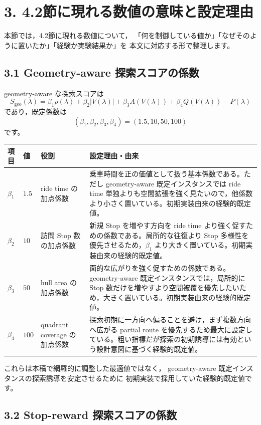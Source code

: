 \documentclass[a4paper,11pt]{article}
\begin{document}
\section*{3. 4.2節に現れる数値の意味と設定理由}

本節では，4.2節に現れる数値について，
「何を制御している値か」「なぜそのように置いたか」「経験か実験結果か」を
本文に対応する形で整理します。

\subsection*{3.1 Geometry-aware 探索スコアの係数}

geometry-aware な探索スコアは
\[
S_{\mathrm{geo}}(\lambda) =
\beta_1 \rho(\lambda)
+ \beta_2 |V(\lambda)|
+ \beta_3 A(V(\lambda))
+ \beta_4 Q(V(\lambda))
- P(\lambda)
\]
であり，既定係数は
\[
(\beta_1,\beta_2,\beta_3,\beta_4)=(1.5,10,50,100)
\]
です。

\begin{tabularx}{\linewidth}{L{2.0cm}L{2.0cm}L{3.5cm}X}
\toprule
項目 & 値 & 役割 & 設定理由・由来 \\
\midrule
$\beta_1$ & $1.5$ & ride time の加点係数 & 乗車時間を正の価値として扱う基本係数である。ただし geometry-aware 既定インスタンスでは ride time 単独よりも空間拡張を強く見たいので，他係数より小さく置いている。初期実装由来の経験的既定値。 \\
$\beta_2$ & $10$ & 訪問 Stop 数の加点係数 & 新規 Stop を増やす方向を ride time より強く促すための係数である。局所的な往復より Stop 多様性を優先させるため，$\beta_1$ より大きく置いている。初期実装由来の経験的既定値。 \\
$\beta_3$ & $50$ & hull area の加点係数 & 面的な広がりを強く促すための係数である。geometry-aware 既定インスタンスでは，局所的に Stop 数だけを増やすより空間被覆を優先したいため，大きく置いている。初期実装由来の経験的既定値。 \\
$\beta_4$ & $100$ & quadrant coverage の加点係数 & 探索初期に一方向へ偏ることを避け，まず複数方向へ広がる partial route を優先するため最大に設定している。粗い指標だが探索の初期誘導には有効という設計意図に基づく経験的既定値。 \\
\bottomrule
\end{tabularx}

これらは本稿で網羅的に調整した最適値ではなく，
geometry-aware 既定インスタンスの探索誘導を安定させるために
初期実装で採用していた経験的既定値です。

\subsection*{3.2 Stop-reward 探索スコアの係数}
\end{document}
